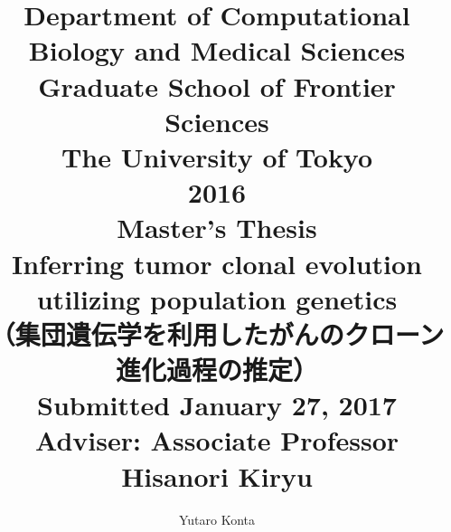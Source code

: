 \documentclass[12pt]{article}
\begin{document}
\title{{\large Department of Computational Biology and Medical Sciences\\Graduate School of Frontier Sciences\\The University of Tokyo}\vspace{4cm}\\2016\\Master's Thesis\vspace{1cm}\\Inferring tumor clonal evolution utilizing population genetics\\（集団遺伝学を利用したがんのクローン進化過程の推定）\vspace{3cm}\\{\large Submitted January 27, 2017\\Adviser: Associate Professor Hisanori Kiryu}\vspace{3cm}}
\author{{\Large Yutaro Konta}}
\date{}
\maketitle
\thispagestyle{empty}
\newpage



\newpage
\tableofcontents
\newpage







%








\end{document}
